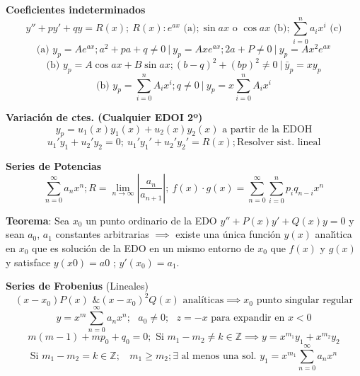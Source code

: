 \documentclass[10pt,landscape,letterpaper]{article}
\begin{document}
\begin{multicols}{3}
\textbf{Coeficientes indeterminados}
\vspace{-5pt}
\[y''+py'+qy=R(x); \ R(x) :  e^{ax} \mbox{ (a)}; \sin{ax} \mbox{ o } \cos{ax}\mbox{ (b)}; \sum_{i=0}^n a_i x^i\mbox{ (c)}\]
\vspace{-8pt}
\[\mbox{(a) } y_p=Ae^{ax}; a^2+pa+q\neq 0 \ \vert \  y_p=Axe^{ax}; 2a+P \neq 0 \ \vert \ y_p=Ax^2e^{ax}\]
\[\mbox{(b) } y_p=A\cos{ax}+B\sin{ax}; (b-q)^2+(bp)^2\neq 0 \ \vert \  \bar{y}_p=x y_p\]
\vspace{-10pt}
\[\mbox{(b) } y_p=\sum_{i=0}^n A_i x^i; q\neq 0 \ \vert \ y_p=x\sum_{i=0}^n A_i x^i\]
\vspace{-6.5pt}

\textbf{Variación de ctes. (Cualquier EDOI 2º)}
\vspace{-5pt}
\[y_p=u_1(x)y_1(x)+u_2(x)y_2(x) \mbox{ a partir de la EDOH}\]
\[u_1'y_1+u_2'y_2=0; \ u_1'y_1'+u_2'y_2'=R(x); \mbox{Resolver sist. lineal}\]

\textbf{Series de Potencias}
\vspace{-5pt}
\[\sum_{n=0}^\infty{a_{n}x^{n}}; R=\lim_{n \to \infty}{\left| \frac{a_{n}}{a_{n+1}} \right|}; \ f(x)\cdot g(x)=\sum_{n=0}^\infty \sum_{i=0}^n{p_{i}q_{n-i}}x^{n} \]
\vspace{-7.5pt}

\textbf{Teorema}: Sea $x_{0}$ un punto ordinario de la EDO  $y''+P(x)y'+Q(x)y=0$ y sean $a_{0}$, $a_{1}$ constantes arbitrarias $\implies$ existe una única función $y(x)$ analı́tica en $x_{0}$ que es solución de la EDO en un mismo entorno de $x_{0}$ que $f(x)$ y $g(x)$ y satisface $y(x0) = a0$ ; $y'(x_{0} ) = a_{1}$.
\vspace{3pt}

\textbf{Series de Frobenius} (Lineales)
\vspace{-5pt}
\[(x-x_0)P(x) \mbox{ \& } (x-x_0)^2Q(x) \mbox{ analíticas} \implies x_0 \mbox{ punto singular regular}\]
\vspace{-13pt}
\[y=x^m\sum^\infty_{n=0}{a_n x^n}; \ \ \ a_0 \neq 0; \ \ \ z = -x \mbox{ para expandir en } x<0\]
\vspace{-10pt}
\[m(m-1)+m p_0+q_0 = 0; \mbox{ Si } m_1-m_2 \neq k\in \mathbb{Z} \implies y=x^{m_1}y_1+x^{m_2}y_2\]
\vspace{-10pt}
\[\mbox{Si } m_1-m_2 = k\in \mathbb{Z}; \ \ \ \ m_1 \geq m_2; \exists \mbox{ al menos una sol. } y_1=x^{m_1}\sum^\infty_{n=0}{a_n x^n}\]
\vspace{-7.5pt}
\phantom{ }


\end{multicols}
\end{document}
